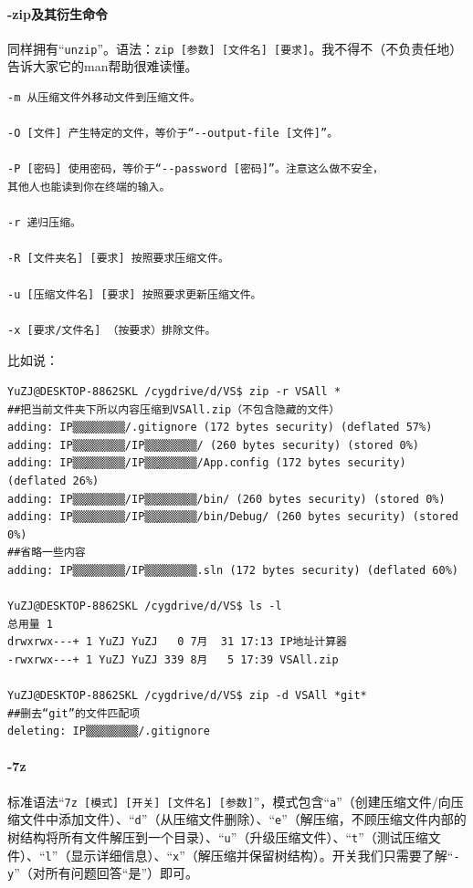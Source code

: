 \paragraph{-zip及其衍生命令}
同样拥有“\verb|unzip|”。语法：\verb|zip [参数] [文件名] [要求]|。我不得不（不负责任地）告诉大家它的man帮助很难读懂。\par
\begin{verbatim}
-m 从压缩文件外移动文件到压缩文件。

-O [文件] 产生特定的文件，等价于“--output-file [文件]”。

-P [密码] 使用密码，等价于“--password [密码]”。注意这么做不安全，
其他人也能读到你在终端的输入。

-r 递归压缩。

-R [文件夹名] [要求] 按照要求压缩文件。

-u [压缩文件名] [要求] 按照要求更新压缩文件。

-x [要求/文件名] （按要求）排除文件。
\end{verbatim}\par
比如说：\par
\begin{verbatim}
YuZJ@DESKTOP-8862SKL /cygdrive/d/VS$ zip -r VSAll *
##把当前文件夹下所以内容压缩到VSAll.zip（不包含隐藏的文件）
adding: IP▒▒ַ▒▒▒▒▒▒/.gitignore (172 bytes security) (deflated 57%)
adding: IP▒▒ַ▒▒▒▒▒▒/IP▒▒ַ▒▒▒▒▒▒/ (260 bytes security) (stored 0%)
adding: IP▒▒ַ▒▒▒▒▒▒/IP▒▒ַ▒▒▒▒▒▒/App.config (172 bytes security) (deflated 26%)
adding: IP▒▒ַ▒▒▒▒▒▒/IP▒▒ַ▒▒▒▒▒▒/bin/ (260 bytes security) (stored 0%)
adding: IP▒▒ַ▒▒▒▒▒▒/IP▒▒ַ▒▒▒▒▒▒/bin/Debug/ (260 bytes security) (stored 0%)
##省略一些内容
adding: IP▒▒ַ▒▒▒▒▒▒/IP▒▒ַ▒▒▒▒▒▒.sln (172 bytes security) (deflated 60%)

YuZJ@DESKTOP-8862SKL /cygdrive/d/VS$ ls -l
总用量 1
drwxrwx---+ 1 YuZJ YuZJ   0 7月  31 17:13 IP地址计算器
-rwxrwx---+ 1 YuZJ YuZJ 339 8月   5 17:39 VSAll.zip

YuZJ@DESKTOP-8862SKL /cygdrive/d/VS$ zip -d VSAll *git*
##删去“git”的文件匹配项
deleting: IP▒▒ַ▒▒▒▒▒▒/.gitignore
\end{verbatim}
\paragraph{-7z}
标准语法“\verb|7z [模式] [开关] [文件名] [参数]|”，模式包含“\verb|a|”（创建压缩文件/向压缩文件中添加文件）、“\verb|d|”（从压缩文件删除）、“\verb|e|”（解压缩，不顾压缩文件内部的树结构将所有文件解压到一个目录）、“\verb|u|”（升级压缩文件）、“\verb|t|”（测试压缩文件）、“\verb|l|”（显示详细信息）、“\verb|x|”（解压缩并保留树结构）。开关我们只需要了解“\verb|-y|”（对所有问题回答“是”）即可。
